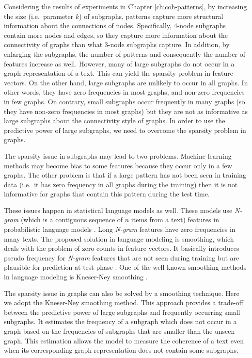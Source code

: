 Considering the results of experiments in Chapter \ref{ch:coh-patterns}, 
by increasing the size (i.e.\ parameter $k$) of subgraphs, patterns capture more
structural information about the connections of nodes. 
Specifically, 4-node subgraphs contain more nodes and edges, so they capture more information about the connectivity of graphs than what 3-node subgraphs capture.  
In addition, by enlarging the subgraphs, the number of patterns and consequently the number of features increase as well.   
However, many of large subgraphs do not occur in a graph representation of a text. 
This can yield the sparsity problem in feature vectors. 
On the other hand, large subgraphs are unlikely to occur in all graphs. 
In other words, they have zero frequencies in most graphs, and non-zero frequencies in few graphs.  
On contrary, small subgraphs occur frequently in many graphs (so they have non-zero frequencies in most graphs) but
they are not as informative as large subgraphs about the
connectivity style of graphs. 
In order to use the predictive power of large subgraphs, we need to overcome the sparsity problem in graphs. 
  
The sparsity issue in subgraphs may lead to two problems. 
Machine learning methods may become bias to some features because they occur only in a few graphs. 
The other problem is that if a large pattern has not been seen in training data (i.e.\ it has zero frequency in all graphs during the training) then it is not informative for graphs  that contain this pattern during the test time. 

These issues happen in statistical language models as well. 
These models use \emph{N-gram} (which is a contiguous sequence of $n$ items from a text) features in probabilistic language models \cite[p.~98]{jurafsky08}. 
Long \emph{N-gram} features have zero frequencies in many texts.  
The proposed solution in language modeling is smoothing, which deals with the problem of zero counts in feature vectors. 
It basically introduces pseudo frequency for \emph{N-gram} features that are not seen during training but are plausible for prediction at test phase \cite[p.~99]{jurafsky08}. 
One of the \mbox{well-known} smoothing methods in language modeling is \mbox{Kneser-Ney} smoothing \cite[p.~110]{jurafsky08}. 

The sparsity issue in graphs can also be solved by a smoothing technique.  
Here we adopt the \mbox{Kneser-Ney} smoothing method.   
This approach provides a trade-off between the predictive power of large subgraphs and frequently occurring small subgraphs. 
It estimates the frequency of a subgraph which does not occur in a graph based on the frequencies of subgraphs that are smaller than the unseen graph. 
This estimation allows the model to measure the coherence of a text even when its corresponding graph representation does not contain some subgraphs. 

